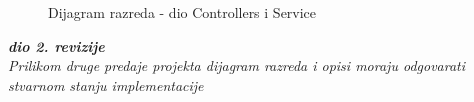 			\begin{figure}[H]
				\centering
				\caption{Dijagram razreda - dio Controllers i Service}
				\label{}
			\end{figure}
			
			\textbf{\textit{dio 2. revizije}}\\			
			
			\textit{Prilikom druge predaje projekta dijagram razreda i opisi moraju odgovarati stvarnom stanju implementacije}
			
			
			
			\eject
		
%			
%			
%			
%			
%			
%		
%			
%			
%			
%		
%		
